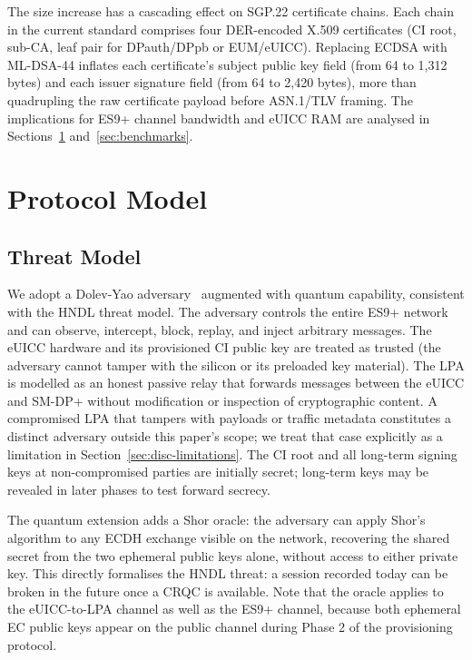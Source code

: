 \documentclass[a4paper,fleqn]{cas-sc}
\begin{document}
The size increase has a cascading effect on SGP.22 certificate chains.
Each chain in the current standard comprises four DER-encoded X.509
certificates (CI root, sub-CA, leaf pair for DPauth/DPpb or EUM/eUICC).
Replacing ECDSA with ML-DSA-44 inflates each certificate's subject
public key field (from 64 to 1,312 bytes) and each issuer signature field
(from 64 to 2,420 bytes), more than quadrupling the raw certificate
payload before ASN.1/TLV framing. The implications for ES9+ channel
bandwidth and eUICC RAM are analysed in Sections~\ref{sec:system}
and~\ref{sec:benchmarks}.

\section{Protocol Model}
\label{sec:system}

\subsection{Threat Model}
\label{sec:sys-threat}

We adopt a Dolev-Yao adversary~\cite{dolev1983security} augmented with
quantum capability, consistent with the HNDL threat model. The adversary
controls the entire ES9+ network and can observe, intercept, block, replay,
and inject arbitrary messages. The eUICC hardware and its provisioned
CI public key are treated as trusted (the adversary cannot tamper with
the silicon or its preloaded key material). The LPA is modelled as an
honest passive relay that forwards messages between the eUICC and
SM-DP+ without modification or inspection of cryptographic content.
A compromised LPA that tampers with payloads or traffic metadata
constitutes a distinct adversary outside this paper's scope; we treat
that case explicitly as a limitation in Section~\ref{sec:disc-limitations}.
The CI root and all long-term signing keys at non-compromised parties
are initially secret; long-term keys may be revealed in later phases
to test forward secrecy.

The quantum extension adds a Shor oracle: the adversary can apply
Shor's algorithm to any ECDH exchange visible on the network, recovering
the shared secret from the two ephemeral public keys alone, without
access to either private key. This directly formalises the HNDL threat:
a session recorded today can be broken in the future once a CRQC is
available. Note that the oracle applies to the eUICC-to-LPA channel
as well as the ES9+ channel, because both ephemeral EC public keys
appear on the public channel during Phase 2 of the provisioning protocol.
\end{document}

